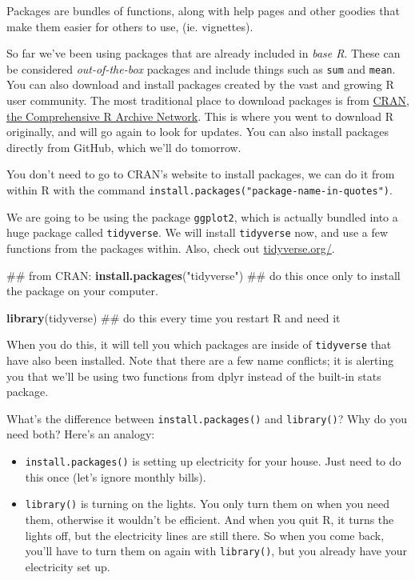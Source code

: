 \documentclass[]{book}
\newenvironment{Shaded}{\begin{snugshade}}{\end{snugshade}}
\newcommand{\KeywordTok}[1]{\textcolor[rgb]{0.13,0.29,0.53}{\textbf{{#1}}}}
\newcommand{\StringTok}[1]{\textcolor[rgb]{0.31,0.60,0.02}{{#1}}}
\newcommand{\NormalTok}[1]{{#1}}
\providecommand{\tightlist}{%
  \setlength{\itemsep}{0pt}\setlength{\parskip}{0pt}}
\theoremstyle{definition}
\theoremstyle{definition}
\theoremstyle{definition}
\theoremstyle{remark}
\begin{document}
Packages are bundles of functions, along with help pages and other
goodies that make them easier for others to use, (ie. vignettes).

So far we've been using packages that are already included in \emph{base
R}. These can be considered \emph{out-of-the-box} packages and include
things such as \texttt{sum} and \texttt{mean}. You can also download and
install packages created by the vast and growing R user community. The
most traditional place to download packages is from
\href{https://cran.r-project.org/}{CRAN, the Comprehensive R Archive
Network}. This is where you went to download R originally, and will go
again to look for updates. You can also install packages directly from
GitHub, which we'll do tomorrow.

You don't need to go to CRAN's website to install packages, we can do it
from within R with the command
\texttt{install.packages("package-name-in-quotes")}.

We are going to be using the package \texttt{ggplot2}, which is actually
bundled into a huge package called \texttt{tidyverse}. We will install
\texttt{tidyverse} now, and use a few functions from the packages
within. Also, check out
\href{https://www.tidyverse.org}{tidyverse.org/}.

\begin{Shaded}
\begin{Highlighting}[]
\NormalTok{## from CRAN:}
\KeywordTok{install.packages}\NormalTok{(}\StringTok{"tidyverse"}\NormalTok{) ## do this once only to install the package on your computer.}
\end{Highlighting}
\end{Shaded}

\begin{Shaded}
\begin{Highlighting}[]
\KeywordTok{library}\NormalTok{(tidyverse) ## do this every time you restart R and need it }
\end{Highlighting}
\end{Shaded}

When you do this, it will tell you which packages are inside of
\texttt{tidyverse} that have also been installed. Note that there are a
few name conflicts; it is alerting you that we'll be using two functions
from dplyr instead of the built-in stats package.

What's the difference between \texttt{install.packages()} and
\texttt{library()}? Why do you need both? Here's an analogy:

\begin{itemize}
\tightlist
\item
  \texttt{install.packages()} is setting up electricity for your house.
  Just need to do this once (let's ignore monthly bills).
\item
  \texttt{library()} is turning on the lights. You only turn them on
  when you need them, otherwise it wouldn't be efficient. And when you
  quit R, it turns the lights off, but the electricity lines are still
  there. So when you come back, you'll have to turn them on again with
  \texttt{library()}, but you already have your electricity set up.
\end{itemize}
\end{document}

